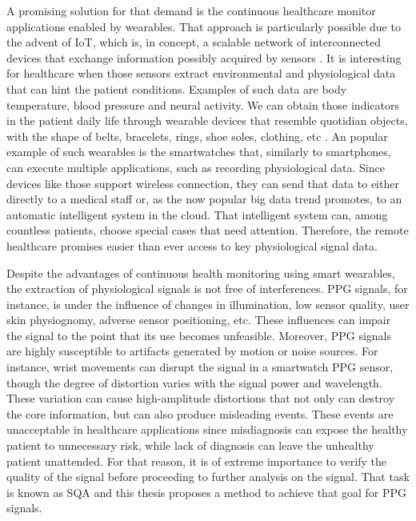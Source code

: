 A promising solution for that demand is the continuous healthcare monitor applications enabled by wearables. That approach is particularly possible due to the advent of \gls{IoT}, which is, in concept, a scalable network of interconnected devices that exchange information possibly acquired by sensors \cite{aouedi2024survey}. It is interesting for healthcare when those sensors extract environmental and physiological data that can hint the patient conditions. Examples of such data are body temperature, blood pressure and neural activity. We can obtain those indicators in the patient daily life through wearable devices that resemble quotidian objects, with the shape of belts, bracelets, rings, shoe soles, clothing, etc \cite{van2024smart}. An popular example of such wearables is the smartwatches that, similarly to smartphones, can execute multiple applications, such as recording physiological data. Since devices like those support wireless connection, they can send that data to either directly to a medical staff or, as the now popular big data trend promotes, to an automatic intelligent system in the cloud. That intelligent system can, among countless patients, choose special cases that need attention. Therefore, the remote healthcare promises easier than ever access to key physiological signal data. 

Despite the advantages of continuous health monitoring using smart wearables, the extraction of physiological signals is not free of interferences. \gls{PPG} signals, for instance, is under the influence of changes in illumination, low sensor quality, user skin physiognomy, adverse sensor positioning, etc. These influences can impair the signal to the point that its use becomes unfeasible. Moreover, \gls{PPG} signals are highly susceptible to artifacts generated by motion or noise sources. For instance, wrist movements can disrupt the signal in a smartwatch \gls{PPG} sensor, though the degree of distortion varies with the signal power and wavelength. These variation can cause high-amplitude distortions that not only can destroy the core information, but can also produce misleading events. These events are unacceptable in healthcare applications since misdiagnosis can expose the healthy patient to unnecessary risk, while lack of diagnosis can leave the unhealthy patient unattended. For that reason, it is of extreme importance to verify the quality of the signal before proceeding to further analysis on the signal. That task is known as \gls{SQA} and this thesis proposes a method to achieve that goal for \gls{PPG} signals.


